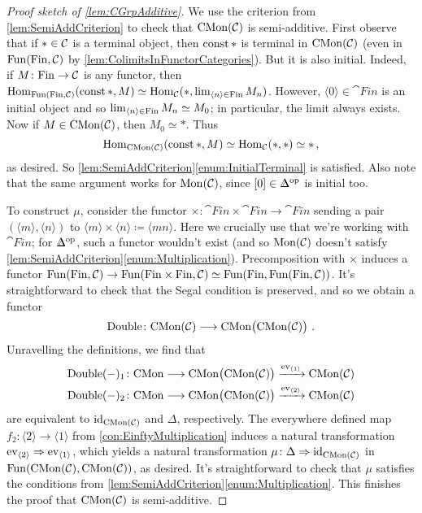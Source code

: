 \begin{proof}[Proof sketch of \cref{lem:CGrpAdditive}]
	We use the criterion from \cref{lem:SemiAddCriterion} to check that $\mathrm{CMon}(\mathcal{C})$ is semi-additive. First observe that if $*\in\mathcal{C}$ is a terminal object, then $\operatorname{const} *$ is terminal in $\mathrm{CMon}(\mathcal{C})$ (even in $\operatorname{Fun}(\mathrm{Fin},\mathcal{C})$ by \cref{lem:ColimitsInFunctorCategories}). But it is also initial. Indeed, if $M\colon \mathrm{Fin}\rightarrow\mathcal{C}$ is any functor, then $\operatorname{Hom}_{\mathrm{Fun}(\mathrm{Fin},\mathcal{C})}(\operatorname{const} *,M)\simeq \operatorname{Hom}_{\mathcal{C}}(*,\operatorname*{lim}_{\langle n\rangle\in\mathrm{Fin}} M_n)$. However, $\langle 0\rangle \in\cat{Fin}$ is an initial object and so $\operatorname*{lim}_{\langle n\rangle\in\mathrm{Fin}} M_n\simeq M_0$; in particular, the limit always exists. Now if $M\in \mathrm{CMon}(\mathcal{C})$, then $M_0\simeq *$. Thus
	\begin{equation*}
		\operatorname{Hom}_{\mathrm{CMon}(\mathcal{C})}(\operatorname{const} *,M)\simeq \operatorname{Hom}_{\mathcal{C}}(*,*)\simeq *\,,
	\end{equation*}
	as desired. So \cref{lem:SemiAddCriterion}\cref{enum:InitialTerminal} is satisfied. Also note that the same argument works for $\mathrm{Mon}(\mathcal{C})$, since $[0]\in \IDelta^\op$ is initial too.
	
	To construct $\mu$, consider the functor $\times\colon  \cat{Fin}\times \cat{Fin}\rightarrow \cat{Fin}$ sending a pair $(\langle m\rangle,\langle n\rangle)$ to $\langle m\rangle \times\langle n\rangle \coloneqq \langle mn\rangle$. Here we crucially use that we're working with $\cat{Fin}$; for $\IDelta^\op$, such a functor wouldn't exist (and so $\mathrm{Mon}(\mathcal{C})$ doesn't satisfy \cref{lem:SemiAddCriterion}\cref{enum:Multiplication}). Precomposition with $\times$ induces a functor $\Fun\!\left(\cat{Fin},\Cc\right)\rightarrow \Fun\!\left(\cat{Fin}\times\cat{Fin},\Cc\right)\simeq \Fun\lef(\cat{Fin},\Fun(\cat{Fin},\Cc)\righ)$. It's straightforward to check that the Segal condition is preserved, and so we obtain a functor
	\begin{equation*}
		\operatorname{Double}\colon \cat{CMon}(\Cc)\longrightarrow\cat{CMon}\lef(\cat{CMon}(\Cc)\righ)\,.
	\end{equation*}
	Unravelling the definitions, we find that
	\begin{align*}
		\operatorname{Double}(-)_1\colon \cat{CMon} &\longrightarrow \cat{CMon}\lef(\cat{CMon}(\Cc)\righ)\xrightarrow{\ev_{\langle 1\rangle}}\cat{CMon}(\Cc)\\
		\operatorname{Double}(-)_2\colon \cat{CMon} &\longrightarrow \cat{CMon}\lef(\cat{CMon}(\Cc)\righ)\xrightarrow{\ev_{\langle 2\rangle}} \cat{CMon}(\Cc)
	\end{align*}
	are equivalent to $\operatorname{id}_{\mathrm{CMon}(\mathcal{C})}$ and $\Delta$, respectively. The everywhere defined map $f_2\colon \langle 2\rangle\rightarrow \langle 1\rangle$ from \cref{con:EinftyMultiplication} induces a natural transformation $\operatorname{ev}_{\langle 2\rangle}\Rightarrow \operatorname{ev}_{\langle 1\rangle}$, which yields a natural transformation $\mu\colon \Delta\Rightarrow \operatorname{id}_{\mathrm{CMon}(\mathcal{C})}$ in $\operatorname{Fun}(\mathrm{CMon}(\mathcal{C}),\mathrm{CMon}(\mathcal{C}))$, as desired. It's straightforward to check that $\mu$ satisfies the conditions from \cref{lem:SemiAddCriterion}\cref{enum:Multiplication}. This finishes the proof that $\mathrm{CMon}(\mathcal{C})$ is semi-additive.
	

\end{proof}

